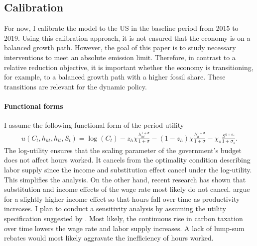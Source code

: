 \subsection{Calibration}\label{subsec:calib}


For now, I calibrate the model to the US in the baseline period from 2015 to 2019. Using this calibration approach, it is not ensured that the economy is on a balanced growth path. However, the goal of this paper is to study necessary interventions to meet an absolute emission limit. Therefore, in contrast to a relative reduction objective, it is important whether the economy is transitioning, for example, to a balanced growth path with a higher fossil share. These transitions are relevant for the dynamic policy. 




\paragraph{Functional forms} I assume the following functional form of the period utility
\begin{align}
u(C_t,h_{ht}, h_{lt}, S_t )= \log(C_t)-z_h\chi\frac{h_{ht}^{1+\sigma}}{{1+\sigma}}-(1-z_h)\chi\frac{h_{lt}^{1+\sigma}}{{1+\sigma}}-\chi_s\frac{S^{1+\sigma_s}}{1+\sigma_s}.
\end{align}
The log-utility ensures that the scaling parameter of the government's budget does not affect hours worked. It cancels from the optimality condition describing labor supply since the income and substitution effect cancel under the log-utility. 
This simplifies the analysis. On the other hand, recent research has shown that substitution and income effects of the wage rate most likely do not cancel. \cite{Boppart2019LaborPerspectiveb} argue for a slightly higher income effect so that hours fall over time as productivity increases. I plan to conduct a sensitivity analysis by assuming the utility specification suggested by \cite{Boppart2019LaborPerspectiveb}. Most likely, the continuous rise in carbon taxation over time lowers the wage rate and labor supply increases. A lack of lump-sum rebates would most likely aggravate the inefficiency of hours worked. %

